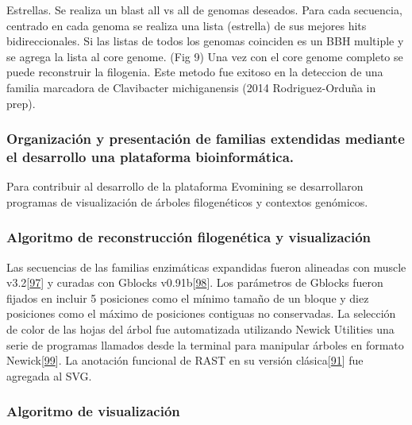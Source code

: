\documentclass[12pt,twoside]{reedthesis}
\begin{document}
  Estrellas. Se realiza un blast all vs all de genomas deseados. Para cada
  secuencia, centrado en cada genoma se realiza una lista (estrella) de
  sus mejores hits bidireccionales. Si las listas de todos los genomas
  coinciden es un BBH multiple y se agrega la lista al core genome. (Fig
  9) Una vez con el core genome completo se puede reconstruir la
  filogenia. Este metodo fue exitoso en la deteccion de una familia
  marcadora de Clavibacter michiganensis (2014 Rodriguez-Orduña in prep).
  
  \subsubsection{Organización y presentación de familias extendidas
  mediante el desarrollo una plataforma
  bioinformática.}\label{organizacion-y-presentacion-de-familias-extendidas-mediante-el-desarrollo-una-plataforma-bioinformatica.}
  
  Para contribuir al desarrollo de la plataforma Evomining se
  desarrollaron programas de visualización de árboles filogenéticos y
  contextos genómicos.
  
  \subsubsection{Algoritmo de reconstrucción filogenética y
  visualización}\label{algoritmo-de-reconstruccion-filogenetica-y-visualizacion}
  
  Las secuencias de las familias enzimáticas expandidas fueron alineadas
  con muscle v3.2{[}\protect\hyperlink{ref-edgar_muscle_2004}{97}{]} y
  curadas con Gblocks
  v0.91b{[}\protect\hyperlink{ref-castresana_selection_2000}{98}{]}. Los
  parámetros de Gblocks fueron fijados en incluir 5 posiciones como el
  mínimo tamaño de un bloque y diez posiciones como el máximo de
  posiciones contiguas no conservadas. La selección de color de las hojas
  del árbol fue automatizada utilizando Newick Utilities una serie de
  programas llamados desde la terminal para manipular árboles en formato
  Newick{[}\protect\hyperlink{ref-junier_newick_2010}{99}{]}. La anotación
  funcional de RAST en su versión
  clásica{[}\protect\hyperlink{ref-aziz_rast_2008}{91}{]} fue agregada al
  SVG.
  
  \subsubsection{Algoritmo de
  visualización}\label{algoritmo-de-visualizacion}
  
\end{document}

